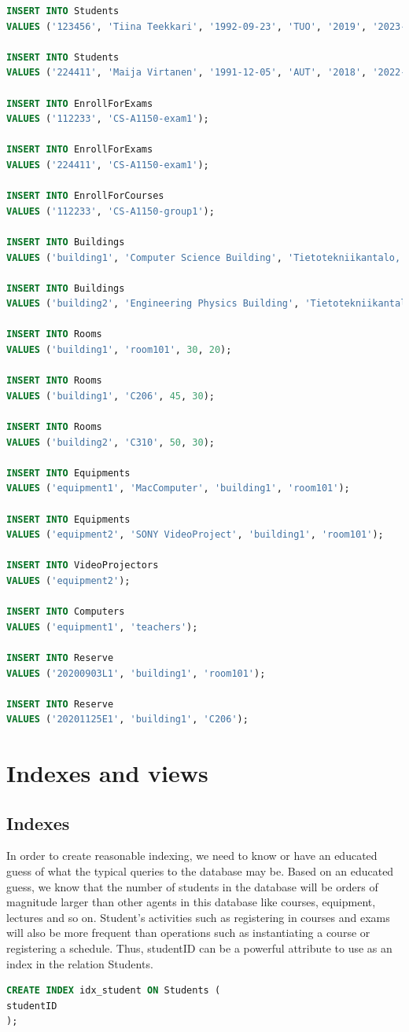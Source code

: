 \documentclass{article}
\begin{document}
\begin{lstlisting}[language=SQL]
INSERT INTO Students
VALUES ('123456', 'Tiina Teekkari', '1992-09-23', 'TUO', '2019', '2023-08-30');

INSERT INTO Students
VALUES ('224411', 'Maija Virtanen', '1991-12-05', 'AUT', '2018', '2022-08-30');

INSERT INTO EnrollForExams
VALUES ('112233', 'CS-A1150-exam1');

INSERT INTO EnrollForExams
VALUES ('224411', 'CS-A1150-exam1');

INSERT INTO EnrollForCourses
VALUES ('112233', 'CS-A1150-group1');

INSERT INTO Buildings
VALUES ('building1', 'Computer Science Building', 'Tietotekniikantalo, Konemiehentie 2, 02150 Espoo');

INSERT INTO Buildings
VALUES ('building2', 'Engineering Physics Building', 'Tietotekniikantalo, Konemiehentie 4, 02150 Espoo');

INSERT INTO Rooms
VALUES ('building1', 'room101', 30, 20);

INSERT INTO Rooms
VALUES ('building1', 'C206', 45, 30);

INSERT INTO Rooms
VALUES ('building2', 'C310', 50, 30);

INSERT INTO Equipments
VALUES ('equipment1', 'MacComputer', 'building1', 'room101');

INSERT INTO Equipments
VALUES ('equipment2', 'SONY VideoProject', 'building1', 'room101');

INSERT INTO VideoProjectors
VALUES ('equipment2');

INSERT INTO Computers
VALUES ('equipment1', 'teachers');

INSERT INTO Reserve
VALUES ('20200903L1', 'building1', 'room101');

INSERT INTO Reserve
VALUES ('20201125E1', 'building1', 'C206'); 
\end{lstlisting}

\section{Indexes and views}

\subsection{Indexes}

In order to create reasonable indexing, we need to know or have an educated guess of what the typical queries to the database may be.
Based on an educated guess, we know that the number of students in the database will be orders of magnitude larger than other agents in this database like courses, equipment, lectures and so on.
Student's activities such as registering in courses and exams will also be more frequent than operations such as instantiating a course or registering a schedule.
Thus, studentID can be a powerful attribute to use as an index in the relation Students.
\begin{lstlisting}[language=SQL]
CREATE INDEX idx_student ON Students (
studentID
);
\end{lstlisting}
\end{document}

